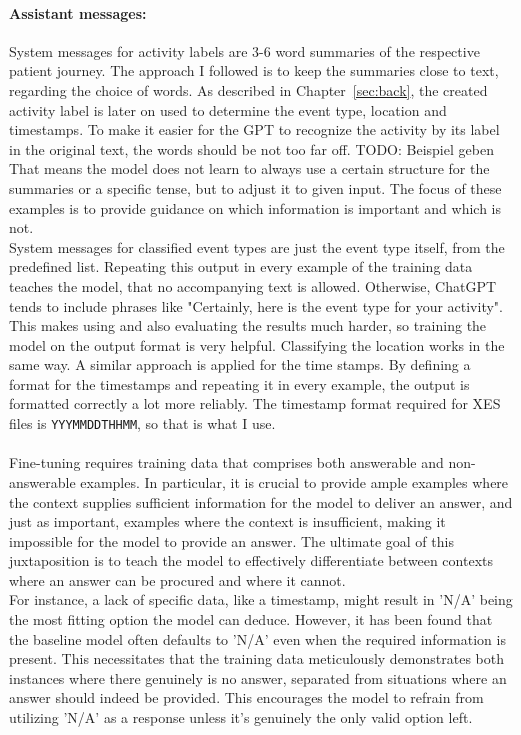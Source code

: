 \paragraph{Assistant messages:} System messages for activity labels are 3-6 word summaries of the respective patient journey. The approach I followed is to keep the summaries close to text, regarding the choice of words. As described in Chapter~\ref{sec:back}, the created activity label is later on used to determine the event type, location and timestamps. To make it easier for the GPT to recognize the activity by its label in the original text, the words should be not too far off. TODO: Beispiel geben That means the model does not learn to always use a certain structure for the summaries or a specific tense, but to adjust it to given input. The focus of these examples is to provide guidance on which information is important and which is not.\\
System messages for classified event types are just the event type itself, from the predefined list. Repeating this output in every example of the training data teaches the model, that no accompanying text is allowed. Otherwise, ChatGPT tends to include phrases like "Certainly, here is the event type for your activity". This makes using and also evaluating the results much harder, so training the model on the output format is very helpful. Classifying the location works in the same way. A similar approach is applied for the time stamps. By defining a format for the timestamps and repeating it in every example, the output is formatted correctly a lot more reliably. The timestamp format required for XES files is \verb|YYYMMDDTHHMM|, so that is what I use.\\\\

Fine-tuning requires training data that comprises both answerable and non-answerable examples. In particular, it is crucial to provide ample examples where the context supplies sufficient information for the model to deliver an answer, and just as important, examples where the context is insufficient, making it impossible for the model to provide an answer. The ultimate goal of this juxtaposition is to teach the model to effectively differentiate between contexts where an answer can be procured and where it cannot.\\
For instance, a lack of specific data, like a timestamp, might result in 'N/A' being the most fitting option the model can deduce. However, it has been found that the baseline model often defaults to 'N/A' even when the required information is present. This necessitates that the training data meticulously demonstrates both instances where there genuinely is no answer, separated from situations where an answer should indeed be provided. This encourages the model to refrain from utilizing 'N/A' as a response unless it’s genuinely the only valid option left.

